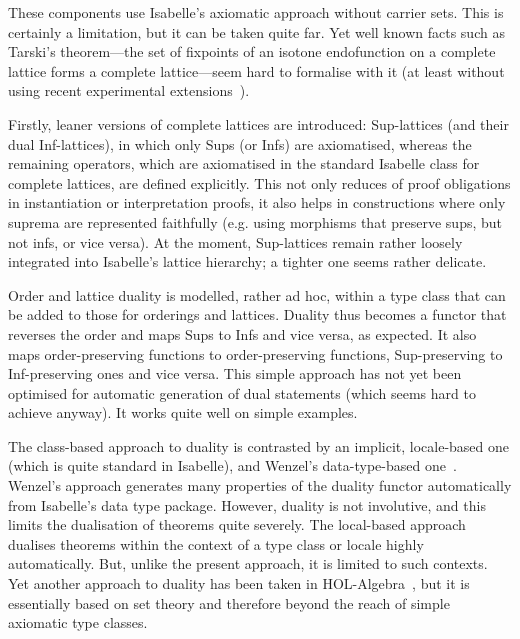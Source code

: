 \documentclass[11pt,a4paper]{article}
\begin{document}
These components use Isabelle's axiomatic approach without carrier
sets. This is certainly a limitation, but it can be taken quite
far. Yet well known facts such as Tarski's theorem---the set of
fixpoints of an isotone endofunction on a complete lattice forms a
complete lattice---seem hard to formalise with it (at least without
using recent experimental extensions~\cite{Kuncar016}).

Firstly, leaner versions of complete lattices are introduced:
Sup-lattices (and their dual Inf-lattices), in which only Sups (or
Infs) are axiomatised, whereas the remaining operators, which are
axiomatised in the standard Isabelle class for complete lattices, are
defined explicitly.  This not only reduces of proof obligations in
instantiation or interpretation proofs, it also helps in constructions
where only suprema are represented faithfully (e.g. using morphisms
that preserve sups, but not infs, or vice versa).  At the moment,
Sup-lattices remain rather loosely integrated into Isabelle's lattice
hierarchy; a tighter one seems rather delicate.

Order and lattice duality is modelled, rather ad hoc, within a type
class that can be added to those for orderings and lattices.  Duality
thus becomes a functor that reverses the order and maps Sups to Infs
and vice versa, as expected. It also maps order-preserving functions
to order-preserving functions, Sup-preserving to Inf-preserving ones
and vice versa. This simple approach has not yet been optimised for
automatic generation of dual statements (which seems hard to achieve
anyway). It works quite well on simple examples.

The class-based approach to duality is contrasted by an implicit,
locale-based one (which is quite standard in Isabelle), and Wenzel's
data-type-based one~\cite{Wenzel}. Wenzel's approach generates many
properties of the duality functor automatically from Isabelle's data
type package. However, duality is not involutive, and this limits the
dualisation of theorems quite severely. The local-based approach
dualises theorems within the context of a type class or locale highly
automatically.  But, unlike the present approach, it is limited to
such contexts. Yet another approach to duality has been taken in
HOL-Algebra~\cite{Ballarin}, but it is essentially based on set theory
and therefore beyond the reach of simple axiomatic type classes.
\end{document}
